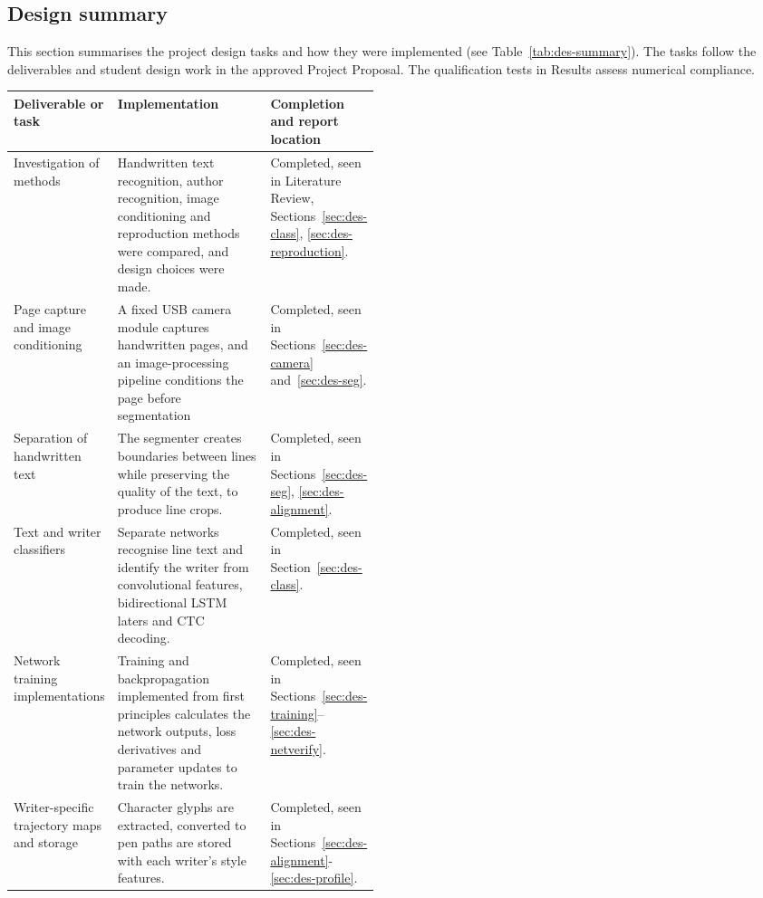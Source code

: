 \subsection{Design summary}
\label{sec:des-summary}
This section summarises the project design tasks and how they were implemented (see Table~\ref{tab:des-summary}). The tasks follow the deliverables and student design work in the approved Project Proposal. The qualification tests in Results assess numerical compliance.

\begin{table}[!htbp]
\centering\small
\begin{tabularx}{\linewidth}{|>{\raggedright\arraybackslash}p{0.24\linewidth}|>{\raggedright\arraybackslash}X|>{\raggedright\arraybackslash}p{0.23\linewidth}|}
\hline
\textbf{Deliverable or task}&\textbf{Implementation}&\textbf{Completion and report location}\\\hline
Investigation of methods& Handwritten text recognition, author recognition, image conditioning and reproduction methods were compared, and design choices were made.&Completed, seen in Literature Review, Sections~\ref{sec:des-class}, \ref{sec:des-reproduction}.\\\hline
Page capture and image conditioning&A fixed USB camera module captures handwritten pages, and an image-processing pipeline conditions the page before segmentation &Completed, seen in Sections~\ref{sec:des-camera} and~\ref{sec:des-seg}.\\\hline
Separation of handwritten text&The segmenter creates boundaries between lines while preserving the quality of the text, to produce line crops.&Completed, seen in Sections~\ref{sec:des-seg}, \ref{sec:des-alignment}.\\\hline
Text and writer classifiers&Separate networks recognise line text and identify the writer from convolutional features, bidirectional LSTM laters and CTC decoding. &Completed, seen in Section~\ref{sec:des-class}.\\\hline
Network training implementations& Training and backpropagation implemented from first principles calculates the network outputs, loss derivatives and parameter updates to train the networks. &Completed, seen in Sections~\ref{sec:des-training}--\ref{sec:des-netverify}.\\\hline
Writer-specific trajectory maps and storage&Character glyphs are extracted, converted to pen paths are stored with each writer's style features.&Completed, seen in Sections~\ref{sec:des-alignment}-\ref{sec:des-profile}.\\\hline

\end{tabularx}
\end{table}
